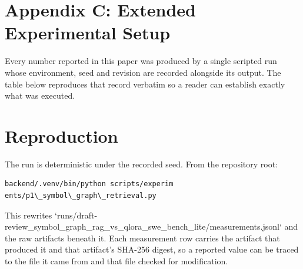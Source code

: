 \documentclass[10pt,twocolumn,letterpaper]{article}
\begin{document}
\section{Appendix C: Extended Experimental Setup}


Every number reported in this paper was produced by a single scripted run whose environment, seed and revision are recorded alongside its output. The table below reproduces that record verbatim so a reader can establish exactly what was executed.
\begin{table}[htbp]
\centering
{}
\end{table}


\section{Reproduction}


The run is deterministic under the recorded seed. From the repository root:


\begin{scriptsize}
\begin{verbatim}
backend/.venv/bin/python scripts/experim
ents/p1\_symbol\_graph\_retrieval.py
\end{verbatim}
\end{scriptsize}


This rewrites `runs/draft-review\_symbol\_graph\_rag\_vs\_qlora\_swe\_bench\_lite/measurements.jsonl` and the raw artifacts beneath it. Each measurement row carries the artifact that produced it and that artifact's SHA-256 digest, so a reported value can be traced to the file it came from and that file checked for modification.
\end{document}
